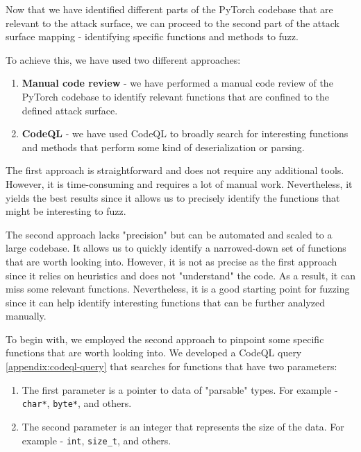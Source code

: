 Now that we have identified different parts of the PyTorch codebase that are relevant to the attack surface, we can proceed to the second part of the attack surface mapping - identifying specific functions and methods to fuzz.

To achieve this, we have used two different approaches:

\begin{enumerate}
    \item \textbf{Manual code review} - we have performed a manual code review of the PyTorch codebase to identify relevant functions that are confined to the defined attack surface.
    \item \textbf{CodeQL} - we have used CodeQL \cite{ql-object-oriented-queries-on-relational-data} to broadly search for interesting functions and methods that perform some kind of deserialization or parsing.
\end{enumerate}

The first approach is straightforward and does not require any additional tools. However, it is time-consuming and requires a lot of manual work. Nevertheless, it yields the best results since it allows us to precisely identify the functions that might be interesting to fuzz.

The second approach lacks "precision" but can be automated and scaled to a large codebase. It allows us to quickly identify a narrowed-down set of functions that are worth looking into. However, it is not as precise as the first approach since it relies on heuristics and does not "understand" the code. As a result, it can miss some relevant functions. Nevertheless, it is a good starting point for fuzzing since it can help identify interesting functions that can be further analyzed manually.

To begin with, we employed the second approach to pinpoint some specific functions that are worth looking into. We developed a CodeQL query \ref{appendix:codeql-query} that searches for functions that have two parameters:

\begin{enumerate}
    \item The first parameter is a pointer to data of "parsable" types. For example - \texttt{char*}, \texttt{byte*}, and others.
    \item The second parameter is an integer that represents the size of the data. For example - \texttt{int}, \texttt{size\_t}, and others.
\end{enumerate}

